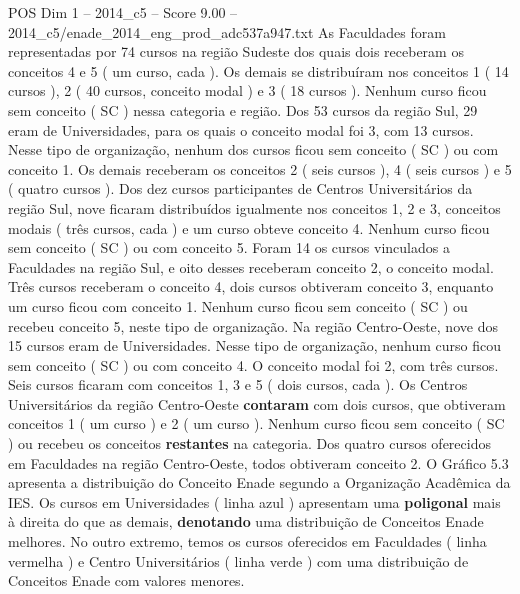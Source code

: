 \begin{textsample}{POS Dim 1 – 2014\_c5 – Score 9.00 – 2014\_c5/enade\_2014\_eng\_prod\_adc537a947.txt}
As Faculdades foram representadas por 74 cursos na região Sudeste dos quais dois receberam os conceitos 4 e 5 ( um curso, cada ).
Os demais se distribuíram nos conceitos 1 ( 14 cursos ), 2 ( 40 cursos, conceito modal ) e 3 ( 18 cursos ).
Nenhum curso ficou sem conceito ( SC ) nessa categoria e região.
Dos 53 cursos da região Sul, 29 eram de Universidades, para os quais o conceito modal foi 3, com 13 cursos.
Nesse tipo de organização, nenhum dos cursos ficou sem conceito ( SC ) ou com conceito 1.
Os demais receberam os conceitos 2 ( seis cursos ), 4 ( seis cursos ) e 5 ( quatro cursos ).
Dos dez cursos participantes de Centros Universitários da região Sul, nove ficaram distribuídos igualmente nos conceitos 1, 2 e 3, conceitos modais ( três cursos, cada ) e um curso obteve conceito 4.
Nenhum curso ficou sem conceito ( SC ) ou com conceito 5.
Foram 14 os cursos vinculados a Faculdades na região Sul, e oito desses receberam conceito 2, o conceito modal.
Três cursos receberam o conceito 4, dois cursos obtiveram conceito 3, enquanto um curso ficou com conceito 1.
Nenhum curso ficou sem conceito ( SC ) ou recebeu conceito 5, neste tipo de organização.
Na região Centro-Oeste, nove dos 15 cursos eram de Universidades.
Nesse tipo de organização, nenhum curso ficou sem conceito ( SC ) ou com conceito 4.
O conceito modal foi 2, com três cursos.
Seis cursos ficaram com conceitos 1, 3 e 5 ( dois cursos, cada ).
Os Centros Universitários da região Centro-Oeste \textbf{contaram} com dois cursos, que obtiveram conceitos 1 ( um curso ) e 2 ( um curso ).
Nenhum curso ficou sem conceito ( SC ) ou recebeu os conceitos \textbf{restantes} na categoria.
Dos quatro cursos oferecidos em Faculdades na região Centro-Oeste, todos obtiveram conceito 2.
O Gráfico 5.3 apresenta a distribuição do Conceito Enade segundo a Organização Acadêmica da IES.
Os cursos em Universidades ( linha azul ) apresentam uma \textbf{poligonal} mais à direita do que as demais, \textbf{denotando} uma distribuição de Conceitos Enade melhores.
No outro extremo, temos os cursos oferecidos em Faculdades ( linha vermelha ) e Centro Universitários ( linha verde ) com uma distribuição de Conceitos Enade com valores menores.

\end{textsample}
